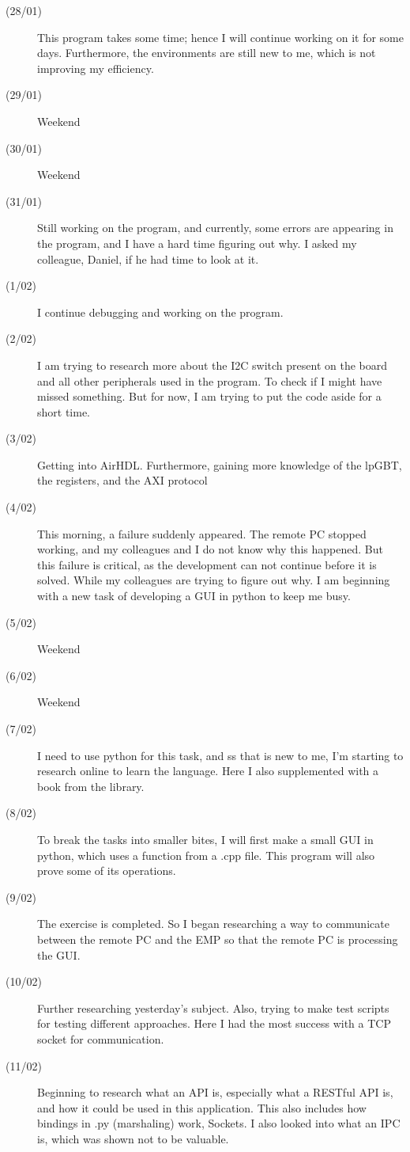 \begin{description}
\item[(28/01)] This program takes some time; hence I will continue working on it for some days. Furthermore, the environments are still new to me, which is not improving my efficiency. 
\item[(29/01)] Weekend
\item[(30/01)] Weekend
\item[(31/01)] Still working on the program, and currently, some errors are appearing in the program, and I have a hard time figuring out why. I asked my colleague, Daniel, if he had time to look at it.
\item[(1/02)] I continue debugging and working on the program. 
\item[(2/02)] I am trying to research more about the I2C switch present on the board and all other peripherals used in the program. To check if I might have missed something. But for now, I am trying to put the code aside for a short time. 
\item[(3/02)] Getting into AirHDL. Furthermore, gaining more knowledge of the lpGBT, the registers, and the AXI protocol
\item[(4/02)] This morning, a failure suddenly appeared. The remote PC stopped working, and my colleagues and I do not know why this happened. But this failure is critical, as the development can not continue before it is solved. While my colleagues are trying to figure out why. I am beginning with a new task of developing a GUI in python to keep me busy.
\item[(5/02)] Weekend
\item[(6/02)] Weekend
\item[(7/02)] I need to use python for this task, and ss that is new to me, I'm starting to research online to learn the language. Here I also supplemented with a book from the library. 
\item[(8/02)] To break the tasks into smaller bites, I will first make a small GUI in python, which uses a function from a .cpp file. This program will also prove some of its operations. 
\item[(9/02)] The exercise is completed. So I began researching a way to communicate between the remote PC and the EMP so that the remote PC is processing the GUI.
\item[(10/02)] Further researching yesterday's subject. Also, trying to make test scripts for testing different approaches. Here I had the most success with a TCP socket for communication.
\item[(11/02)] Beginning to research what an API is, especially what a RESTful API is, and how it could be used in this application. This also includes how bindings in .py (marshaling) work, Sockets. I also looked into what an IPC is, which was shown not to be valuable.

\end{description}
